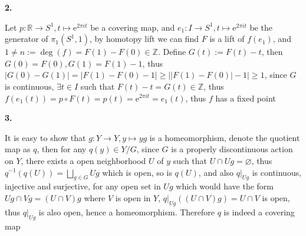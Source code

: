 \documentclass[12pt]{article}
\begin{document}
\textbf{2.} \par
Let $p: \mathbb{R}\rightarrow S^{1}, t\mapsto \mathrm{e}^{2\pi it}$ be a covering map, and $e_{1}: I\rightarrow S^{1}, t\mapsto \mathrm{e}^{2\pi it}$ be the generator of $\pi_{1}(S^{1},1)$, by homotopy lift we can find $F$ is a lift of $f(e_{1})$, and $1\neq n:=\deg(f)=F(1)-F(0)\in\mathbb{Z}$. Define $G(t):=F(t)-t$, then $G(0)=F(0), G(1)=F(1)-1$, thus $|G(0)- G(1)|=|F(1)-F(0)-1|\geq \left||F(1)-F(0)|-1\right|\geq 1$, since $G$ is continuous, $\exists t\in I$ such that $F(t)-t=G(t)\in\mathbb{Z}$, thus $f\left(e_{1}(t)\right)=p\circ F(t)=p(t)=\mathrm{e}^{2\pi it}=e_{1}(t)$, thus $f$ has a fixed point \par
\textbf{3.} \par
It is easy to show that $g: Y\rightarrow Y, y\mapsto yg$ is a homeomorphism, denote the quotient map as $q$, then for any $q(y)\in Y/G$, since $G$ is a properly discontinuous action on $Y$, there exists a open neighborhood $U$ of $y$ such that $U\cap Ug=\varnothing$, thus $q^{-1}(q(U))=\displaystyle{\bigsqcup_{g\in G}}Ug$ which is open, so is $q(U)$, and also $q|_{Ug}$ is continuous, injective and surjective, for any open set in $Ug$ which would have the form $Ug\cap Vg=(U\cap V)g$ where $V$ is open in $Y$, $q|_{Ug}((U\cap V)g)=U\cap V$ is open, thus $q|_{Ug}$ is also open, hence a homeomorphism. Therefore $q$ is indeed a covering map
\end{document}
